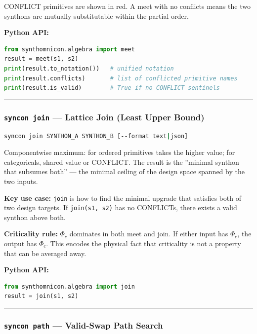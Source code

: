 \documentclass[12pt,a4paper]{article}
\begin{document}
CONFLICT primitives are shown in red. A meet with no conflicts means the two synthons are mutually substitutable within the partial order.

\textbf{Python API:}

\begin{lstlisting}[language=Python]
from synthomnicon.algebra import meet
result = meet(s1, s2)
print(result.to_notation())   # unified notation
print(result.conflicts)       # list of conflicted primitive names
print(result.is_valid)        # True if no CONFLICT sentinels
\end{lstlisting}

\begin{center}
\rule{0.5\textwidth}{0.4pt}
\end{center}

\subsubsection{\texttt{syncon join} --- Lattice Join (Least Upper Bound)}

\begin{lstlisting}[language=bash]
syncon join SYNTHON_A SYNTHON_B [--format text|json]
\end{lstlisting}

Componentwise maximum: for ordered primitives takes the higher value; for categoricals, shared value or CONFLICT. The result is the ''minimal synthon that subsumes both'' --- the minimal ceiling of the design space spanned by the two inputs.

\textbf{Key use case:} \texttt{join} is how to find the minimal upgrade that satisfies both of two design targets. If \texttt{join(s1, s2)} has no CONFLICTs, there exists a valid synthon above both.

\textbf{Criticality rule:} $\Phi_c$ dominates in both meet and join. If either input has $\Phi_c$, the output has $\Phi_c$. This encodes the physical fact that criticality is not a property that can be averaged away.

\textbf{Python API:}

\begin{lstlisting}[language=Python]
from synthomnicon.algebra import join
result = join(s1, s2)
\end{lstlisting}

\begin{center}
\rule{0.5\textwidth}{0.4pt}
\end{center}

\subsubsection{\texttt{syncon path} --- Valid-Swap Path Search}
\end{document}
